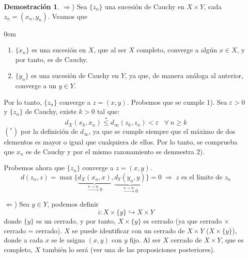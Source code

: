 \documentclass[12pt,twoside]{report}
\theoremstyle{azul}
\theoremstyle{azul2}
\theoremstyle{plain}
\theoremstyle{definition}
\newtheorem*{dem}{Demostración}
\theoremstyle{remark}
\begin{document}
\begin{dem} \;
\justifying

\vspace{-3mm}$\Rightarrow$) Sea $\{z_n\}$ una sucesión de Cauchy en $X \times Y$, cada $z_n=(x_n, y_n)$. Veamos que 
\begin{addmargin}[1,7em]{0em}\begin{enumerate}[1)]
    \item $\{x_n\}$ es una sucesión en $X$, que al ser $X$ completo, converge a alg{\'u}n $x \in X$, y por tanto, es de Cauchy.
    \item $\{y_n\}$ es una sucesión de Cauchy en $Y$, ya que, de manera análoga al anterior, converge a un $y \in Y$. 
\end{enumerate}
\end{addmargin}
Por lo tanto, $\{z_n\}$ converge a $z=(x,y)$. Probemos que se cumple 1). Sea $\varepsilon > 0$ y $\{z_n\}$ de Cauchy, existe $k>0$ tal que:
$$d_X(x_k,x_n) \stackrel{*}{\leq} d_{\infty}(z_k,z_n) < \varepsilon \; \; \;  \forall \: n \geq k$$
$(^*)$ por la definición de $d_{\infty}$, ya que se cumple siempre que el máximo de dos elementos es mayor o igual que cualquiera de ellos. Por lo tanto, se comprueba que $x_n$ es de Cauchy y por el mismo razonamiento se demuestra 2).

 Probemos ahora que $\{z_n\}$ converge a $z=(x,y)$.
$$d(z_n,z)=\max\{\underbrace{d_X(x_n,x)}_{\stackrel{n \to \infty}{\longrightarrow} 0}, \underbrace{d_Y(y_n,y)}_{\stackrel{n \to \infty}{\longrightarrow} 0}\}=0 \; \Rightarrow \; z \text{ es el límite de } z_n$$

$\Leftarrow$) Sea $y \in Y$, podemos definir 
$$i: X \times \{y\} \hookrightarrow X \times Y$$
donde $\{y\}$ es un cerrado, y por tanto, $X \times \{y\}$ es cerrado (ya que cerrado $\times$ cerrado = cerrado). $X$ se puede identificar con un cerrado de $X\times Y$ ($X \times \{y\}$), donde a cada $x$ se le asigna $(x,y)$ con $y$ fijo. Al ser $X$ cerrado de $X \times Y$, que es completo, $X$ también lo será (ver una de las proposiciones posteriores).
\end{dem}
\end{document}
